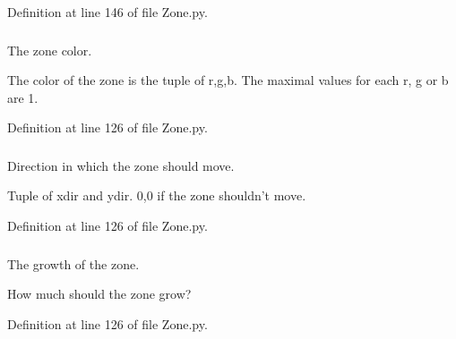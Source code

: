 \-Definition at line 146 of file \-Zone.\-py.

\hypertarget{class_zone_1_1_zone_ad85f29e8e56e3d8eba3faa0e796faef0}{
\subsubsection[{color}]{}}
\label{class_zone_1_1_zone_ad85f29e8e56e3d8eba3faa0e796faef0}


\-The zone color. 

\-The color of the zone is the tuple of r,g,b. \-The maximal values for each r, g or b are 1. 

\-Definition at line 126 of file \-Zone.\-py.

\hypertarget{class_zone_1_1_zone_a1b25df718a504fc19668f15a0e41df8f}{
\subsubsection[{dir}]{}}
\label{class_zone_1_1_zone_a1b25df718a504fc19668f15a0e41df8f}


\-Direction in which the zone should move. 

\-Tuple of xdir and ydir. 0,0 if the zone shouldn't move. 

\-Definition at line 126 of file \-Zone.\-py.

\hypertarget{class_zone_1_1_zone_a12ac29a7558642104103da15eed1000b}{
\subsubsection[{growth}]{}}
\label{class_zone_1_1_zone_a12ac29a7558642104103da15eed1000b}


\-The growth of the zone. 

\-How much should the zone grow? 

\-Definition at line 126 of file \-Zone.\-py.

\hypertarget{class_zone_1_1_zone_ac733124dafd015bfc3fc28c291b22373}{
\subsubsection[{interactive}]{}}
\label{class_zone_1_1_zone_ac733124dafd015bfc3fc28c291b22373}


